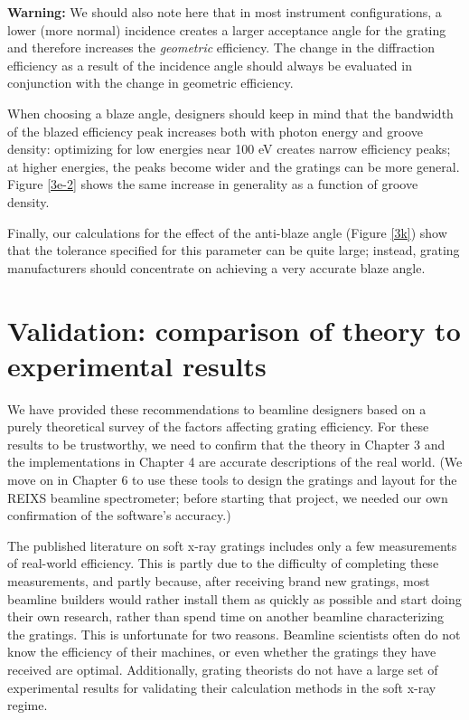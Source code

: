\textbf{Warning:} We should also note here that in most instrument configurations, a lower (more normal) incidence creates a larger acceptance angle for the grating and therefore increases the \emph{geometric} efficiency. The change in the diffraction efficiency as a result of the incidence angle should always be evaluated in conjunction with the change in geometric efficiency.

When choosing a blaze angle, designers should keep in mind that the bandwidth of the blazed efficiency peak increases both with photon energy and groove density: optimizing for low energies near 100 eV creates narrow efficiency peaks; at higher energies, the peaks become wider and the gratings can be more general.
Figure \ref{3e-2} shows the same increase in generality as a function of groove density.

Finally, our calculations for the effect of the anti-blaze angle (Figure \ref{3k}) show that the tolerance specified for this parameter can be quite large; instead, grating manufacturers should concentrate on achieving a very accurate blaze angle.

\section{Validation: comparison of theory to experimental results}
We have provided these recommendations to beamline designers based on a purely theoretical survey of the factors affecting grating efficiency.  For these results to be trustworthy, we need to confirm that the theory in Chapter 3 and the implementations in Chapter 4 are accurate descriptions of the real world.  (We move on in Chapter 6 to use these tools to design the gratings and  layout for the REIXS beamline spectrometer; before starting that project, we needed our own confirmation of the software's accuracy.)

The published literature on soft x-ray gratings includes only a few measurements of real-world efficiency.  This is partly due to the difficulty of completing these measurements, and partly because, after receiving brand new gratings, most beamline builders would rather install them as quickly as possible and start doing their own research, rather than spend time on another beamline characterizing the gratings.  This is unfortunate for two reasons.  Beamline scientists often do not know the efficiency of their machines, or even whether the gratings they have received are optimal. Additionally, grating theorists do not have a large set of experimental results for validating their calculation methods in the soft x-ray regime.

